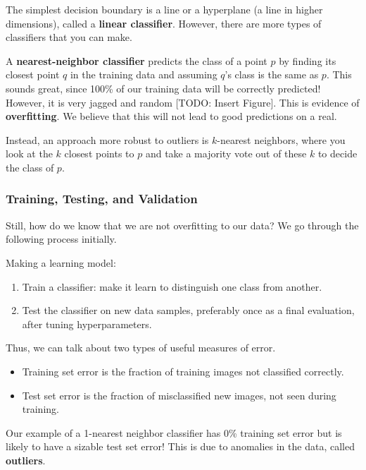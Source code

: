 The simplest decision boundary is a line or a hyperplane (a line in higher dimensions), called a \textbf{linear classifier}. However, there are more types of classifiers that you can make.

A \textbf{nearest-neighbor classifier} predicts the class of a point $p$ by finding its closest point $q$ in the training data and assuming $q$'s class is the same as $p$.
This sounds great, since 100\% of our training data will be correctly predicted! However, it is very jagged and random [TODO: Insert Figure]. This is evidence of \textbf{overfitting}. We believe that this will not
lead to good predictions on a real.

Instead, an approach more robust to outliers is $k$-nearest neighbors, where you look at the $k$ closest points to $p$ and
take a majority vote out of these $k$ to decide the class of $p$.

\subsubsection{Training, Testing, and Validation}

Still, how do we know that we are not overfitting to our data? We go through the following process initially.

\begin{note}
    Making a learning model:
    \begin{enumerate}
        \item Train a classifier: make it learn to distinguish one class from another.
        \item Test the classifier on new data samples, preferably once as a final evaluation, after tuning hyperparameters.
    \end{enumerate}
\end{note}

\begin{definition}[Errors]
    Thus, we can talk about two types of useful measures of error.

    \begin{itemize}
        \item Training set error is the fraction of training images not classified correctly.
        \item Test set error is the fraction of misclassified new images, not seen during training.
    \end{itemize}
\end{definition}

Our example of a 1-nearest neighbor classifier has 0\% training set error but is likely to have a sizable test set error! This is due to anomalies
in the data, called \textbf{outliers}.

